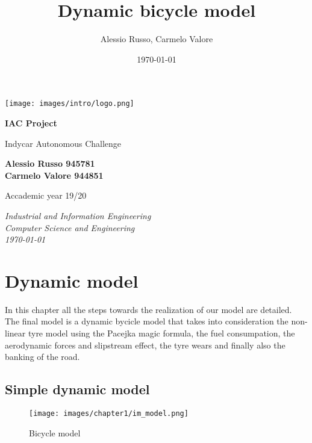 \documentclass{report}
\title{\textbf{Dynamic bicycle model}}
\author{Alessio Russo, Carmelo Valore}
\date{\today}
\let\Oldsection\section
\renewcommand{\section}{\FloatBarrier\Oldsection}
\begin{document}
\begin{titlepage}
    \begin{center}
        \texttt{[image: images/intro/logo.png]}

		\vspace{1cm}

		\Huge
        \textbf{IAC Project}

        \vspace{0.5cm}

		\large
        Indycar Autonomous Challenge 

        \vspace{0.8cm}

 		\normalsize
        \textbf{Alessio Russo 945781\\Carmelo Valore 944851}

        \vfill

		\normalsize
        Accademic year 19/20

        \vspace{0.8cm}

		\normalsize

        \textit{Industrial and Information Engineering}\\
        \textit{Computer Science and Engineering}\\
        \textit{\today}\\

    \end{center}
\end{titlepage}

\newpage
\tableofcontents
\newpage

\chapter{Dynamic model}
In this chapter all the steps towards the realization of our model are detailed. The final model is a dynamic bycicle model that takes into consideration the non-linear tyre model using the Pacejka magic formula, the fuel consumpation, the aerodynamic forces and slipstream effect, the tyre wears and finally also the banking of the road.
\section{Simple dynamic model}

\begin{figure}[h!]
    \centering
    \texttt{[image: images/chapter1/im\_model.png]}
    \caption{Bicycle model}
    \label{fig:bmodel}
\end{figure}
\end{document}
